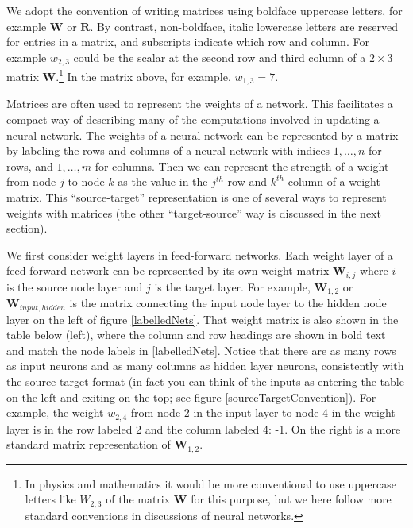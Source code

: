 We adopt the convention of writing matrices using boldface uppercase letters, for example $\mathbf{W}$ or $\mathbf{R}$. By contrast, non-boldface, italic lowercase letters are reserved for entries in a matrix, and subscripts indicate which row and column. For example $w_{2,3}$ could be the scalar at the second row and third column of a $2 \times 3$ matrix $\mathbf{W}$.\footnote{In physics and mathematics it would be more conventional to use uppercase letters like $W_{2,3}$ of the matrix $\mathbf{W}$ for this purpose, but we here follow more standard conventions in discussions of neural networks.} In the matrix above, for example, $w_{1,3} = 7 $.


Matrices are often used to represent the weights of a network. This facilitates a compact way of describing many of the computations involved in updating a neural network. The weights of a neural network can be represented by a matrix by labeling the rows and columns of a neural network with indices $1,\dots,n$ for rows, and $1,\dots,m$ for columns. Then we can represent the strength of a weight from node $j$ to node $k$ as the value in the $j^{th}$ row and $k^{th}$ column of a weight matrix. This ``source-target'' representation is one of several ways to represent weights with matrices (the other ``target-source'' way is discussed in the next section).

We first consider weight layers in feed-forward networks. Each weight layer of a feed-forward network can be represented by its own weight matrix $\textbf{W}_{i,j}$ where $i$ is the source node layer and $j$ is the target layer. For example, $\textbf{W}_{1,2}$ or $\textbf{W}_{input,hidden}$ is the matrix connecting the input node layer to the hidden node layer on the left of figure \ref{labelledNets}. That weight matrix is also shown in the table below (left), where the column and row headings are shown in bold text and match the node labels in \ref{labelledNets}. Notice that there are as many rows as input neurons and as many columns as hidden layer neurons, consistently with the source-target format (in fact you can think of the inputs as entering the table on the left and exiting on the top; see figure \ref{sourceTargetConvention}). For example, the weight $w_{2,4}$ from node 2 in the input layer to node 4 in the weight layer is in the row labeled 2 and the column labeled 4: -1. On the right is a more standard matrix representation of $\textbf{W}_{1,2}$.

